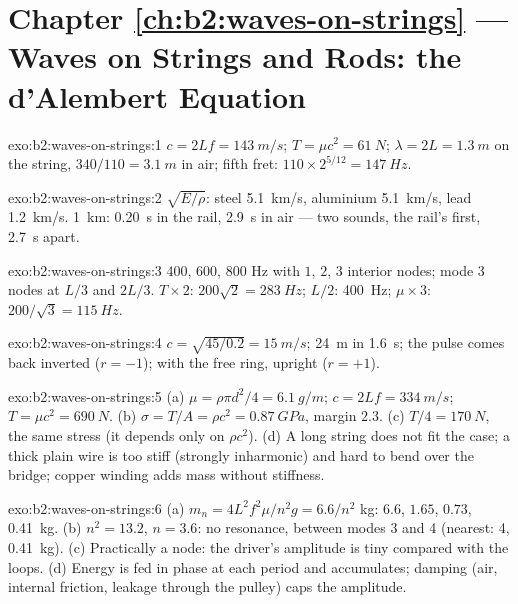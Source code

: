 \section*{Chapter \ref{ch:b2:waves-on-strings} --- Waves on Strings and Rods: the d'Alembert Equation}

\begin{solution}{exo:b2:waves-on-strings:1}
$c = 2Lf = \qty{143}{m/s}$; $T = \mu c^2 = \qty{61}{N}$; $\lambda = 2L = \qty{1.3}{m}$ on the
string, $340/110 = \qty{3.1}{m}$ in air; fifth fret: $110 \times 2^{5/12} =
\qty{147}{Hz}$.
\end{solution}

\begin{solution}{exo:b2:waves-on-strings:2}
$\sqrt{E/\rho}$: steel \qty{5.1}{km/s}, aluminium \qty{5.1}{km/s}, lead
\qty{1.2}{km/s}. \qty{1}{km}: \qty{0.20}{s} in the rail, \qty{2.9}{s} in air ---
two sounds, the rail's first, \qty{2.7}{s} apart.
\end{solution}

\begin{solution}{exo:b2:waves-on-strings:3}
$400$, $600$, $800$ Hz with $1$, $2$, $3$ interior nodes; mode 3 nodes at
$L/3$ and $2L/3$. $T \times 2$: $200\sqrt2 = \qty{283}{Hz}$; $L/2$: \qty{400}{Hz}; $\mu
\times 3$: $200/\sqrt3 = \qty{115}{Hz}$.
\end{solution}

\begin{solution}{exo:b2:waves-on-strings:4}
$c = \sqrt{45/0.2} = \qty{15}{m/s}$; \qty{24}{m} in \qty{1.6}{s}; the pulse comes
back inverted ($r = -1$); with the free ring, upright ($r = +1$).
\end{solution}

\begin{solution}{exo:b2:waves-on-strings:5}
(a) $\mu = \rho\pi d^2/4 = \qty{6.1}{g/m}$; $c = 2Lf = \qty{334}{m/s}$; $T = \mu c^2 =
\qty{690}{N}$. (b) $\sigma = T/A = \rho c^2 = \qty{0.87}{GPa}$, margin $2.3$. (c) $T/4 =
\qty{170}{N}$, the same stress (it depends only on $\rho c^2$). (d) A long
string does not fit the case; a thick plain wire is too stiff (strongly
inharmonic) and hard to bend over the bridge; copper winding adds mass
without stiffness.
\end{solution}

\begin{solution}{exo:b2:waves-on-strings:6}
(a) $m_n = 4L^2f^2\mu/n^2g = 6.6/n^2$ kg: $6.6$, $1.65$, $0.73$, \qty{0.41}{kg}. (b)
$n^2 = 13.2$, $n = 3.6$: no resonance, between modes 3 and 4 (nearest: 4,
\qty{0.41}{kg}). (c) Practically a node: the driver's amplitude is tiny
compared with the loops. (d) Energy is fed in phase at each period and
accumulates; damping (air, internal friction, leakage through the
pulley) caps the amplitude.
\end{solution}

